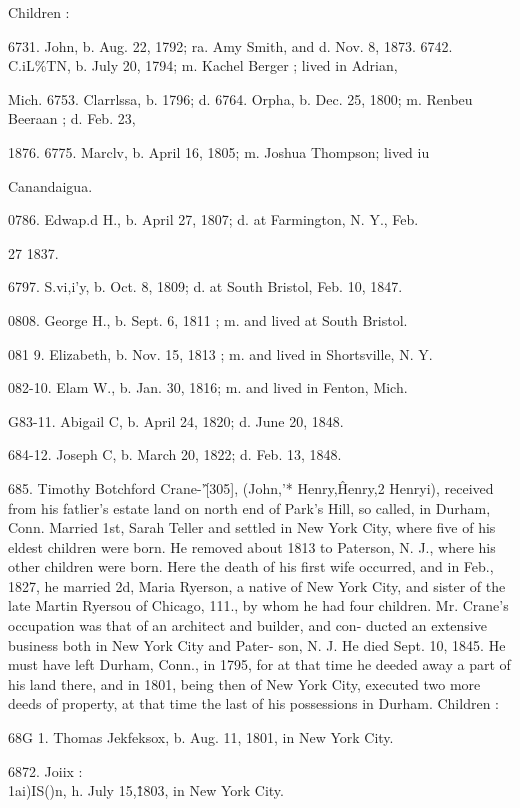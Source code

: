 \documentclass{book}
\begin{document}
Children : 

6731. John, b. Aug. 22, 1792; ra. Amy Smith, and d. Nov. 8, 1873. 
6742. C.iL\%TN, b. July 20, 1794; m. Kachel Berger ; lived in Adrian, 

Mich. 
6753. Clarrlssa, b. 1796; d. 
6764. Orpha, b. Dec. 25, 1800; m. Renbeu Beeraan ; d. Feb. 23, 

1876. 
6775. Marclv, b. April 16, 1805; m. Joshua Thompson; lived iu 

Canandaigua. 




0786. Edwap.d H., b. April 27, 1807; d. at Farmington, N. Y., Feb. 

27 1837. 

6797. S.vi,i'y, b. Oct. 8, 1809; d. at South Bristol, Feb. 10, 1847. 

0808. George H., b. Sept. 6, 1811 ; m. and lived at South Bristol. 

081  9. Elizabeth, b. Nov. 15, 1813 ; m. and lived in Shortsville, N. Y. 

082-10. Elam W., b. Jan. 30, 1816; m. and lived in Fenton, Mich. 

G83-11. Abigail C, b. April 24, 1820; d. June 20, 1848. 

684-12. Joseph C, b. March 20, 1822; d. Feb. 13, 1848. 

685. Timothy Botchford Crane-'\^ [305], (John,'* Henry,\^ 
Henry,2 Henryi), received from his fatlier's estate land on north 
end of Park's Hill, so called, in Durham, Conn. Married 1st, 
Sarah Teller and settled in New York City, where five of his 
eldest children were born. He removed about 1813 to Paterson, 
N. J., where his other children were born. Here the death of 
his first wife occurred, and in Feb., 1827, he married 2d, Maria 
Ryerson, a native of New York City, and sister of the late Martin 
Ryersou of Chicago, 111., by whom he had four children. Mr. 
Crane's occupation was that of an architect and builder, and con- 
ducted an extensive business both in New York City and Pater- 
son, N. J. He died Sept. 10, 1845. He must have left Durham, 
Conn., in 1795, for at that time he deeded away a part of his land 
there, and in 1801, being then of New York City, executed two 
more deeds of property, at that time the last of his possessions in 
Durham. Children : 

68G 1. Thomas Jekfeksox, b. Aug. 11, 1801, in New York City. 

6872. Joiix :\\1ai)IS()n, h. July 15,\^1803, in New York City. 
\end{document}
